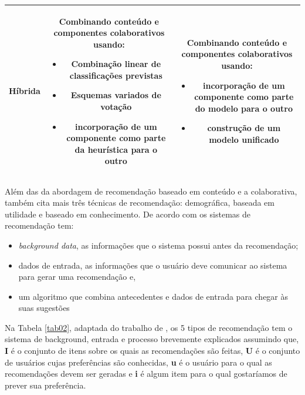 \begin{table}[]
\begin{tabular}{|c|c|c|}
	\textbf{Híbrida} &  \begin{minipage} [t] {0.3\textwidth} Combinando conteúdo e componentes colaborativos usando: \begin{itemize} \item Combinação linear de classificações previstas \item Esquemas variados de votação \item incorporação de um componente como parte da heurística para o outro \end{itemize}        \end{minipage} & \begin{minipage} [t] {0.3\textwidth} Combinando conteúdo e componentes colaborativos usando: \begin{itemize} \item incorporação de um componente como parte do modelo para o outro \item construção de um modelo unificado \end{itemize} \end{minipage} \\ \hline
	\end{tabular}
\end{table}

Além das da abordagem de recomendação baseado em conteúdo e a colaborativa,  também cita mais três técnicas de recomendação: demográfica, baseada em utilidade e 
baseado em conhecimento. De acordo com  os sistemas de recomendação tem: 

\begin{itemize}

	\item \emph{background data}, as informações que o sistema possui antes da recomendação;

	\item dados de entrada, as informações que o usuário deve comunicar ao
	sistema para gerar uma recomendação e,

	\item um algoritmo que combina antecedentes e dados de entrada para chegar às suas sugestões

\end{itemize}

Na Tabela \ref{tab02}, adaptada do trabalho de , os 5 tipos de recomendação tem o sistema de background, entrada e processo brevemente explicados 
assumindo que, \textbf{I} é o conjunto de itens sobre os quais as recomendações são feitas, \textbf{U} é o conjunto de usuários cujas preferências são conhecidas, \textbf{u} 
é o usuário para o qual as recomendações devem ser geradas e \textbf{i} é algum item para o qual gostaríamos de prever sua preferência.

